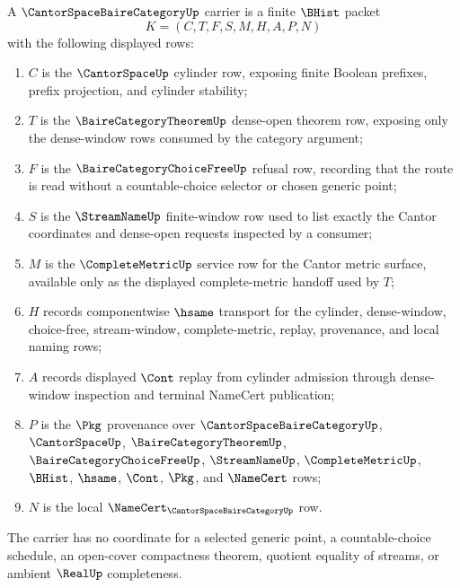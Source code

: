 \begin{definition}
\label{def:cantor-space-baire-category-carrier}
A $\CantorSpaceBaireCategoryUp$ carrier is a finite $\BHist$ packet
$$
K=(C,T,F,S,M,H,A,P,N)
$$
with the following displayed rows:
\begin{enumerate}
\item $C$ is the $\CantorSpaceUp$ cylinder row, exposing finite Boolean prefixes, prefix projection, and cylinder stability;
\item $T$ is the $\BaireCategoryTheoremUp$ dense-open theorem row, exposing only the dense-window rows consumed by the category argument;
\item $F$ is the $\BaireCategoryChoiceFreeUp$ refusal row, recording that the route is read without a countable-choice selector or chosen generic point;
\item $S$ is the $\StreamNameUp$ finite-window row used to list exactly the Cantor coordinates and dense-open requests inspected by a consumer;
\item $M$ is the $\CompleteMetricUp$ service row for the Cantor metric surface, available only as the displayed complete-metric handoff used by $T$;
\item $H$ records componentwise $\hsame$ transport for the cylinder, dense-window, choice-free, stream-window, complete-metric, replay, provenance, and local naming rows;
\item $A$ records displayed $\Cont$ replay from cylinder admission through dense-window inspection and terminal NameCert publication;
\item $P$ is the $\Pkg$ provenance over $\CantorSpaceBaireCategoryUp$, $\CantorSpaceUp$, $\BaireCategoryTheoremUp$, $\BaireCategoryChoiceFreeUp$, $\StreamNameUp$, $\CompleteMetricUp$, $\BHist$, $\hsame$, $\Cont$, $\Pkg$, and $\NameCert$ rows;
\item $N$ is the local $\NameCert_{\CantorSpaceBaireCategoryUp}$ row.
\end{enumerate}
The carrier has no coordinate for a selected generic point, a countable-choice schedule, an open-cover compactness theorem, quotient equality of streams, or ambient $\RealUp$ completeness.
\end{definition}


